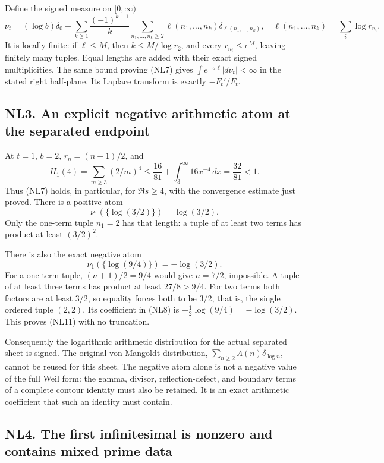 \documentclass[
  10pt,
  a4paper,
]{article}
\begin{document}
Define the signed measure on \([0,\infty)\) \[
\nu_t=(\log b)\delta_0+
\sum_{k\ge1}\frac{(-1)^{k+1}}k
\sum_{n_1,\ldots,n_k\ge2}
\ell(n_1,\ldots,n_k)\delta_{\ell(n_1,\ldots,n_k)},
\quad
\ell(n_1,\ldots,n_k)=\sum_i\log r_{n_i}.
\tag{NL8}
\] It is locally finite: if \(\ell\le M\), then \(k\le M/\log r_2\), and
every \(r_{n_i}\le e^M\), leaving finitely many tuples. Equal lengths
are added with their exact signed multiplicities. The same bound proving
(NL7) gives \(\int e^{-\sigma\ell}|d\nu_t|<\infty\) in the stated right
half-plane. Its Laplace transform is exactly \(-F_t'/F_t\).

\subsection{NL3. An explicit negative arithmetic atom at the separated
endpoint}\label{nl3.-an-explicit-negative-arithmetic-atom-at-the-separated-endpoint}

At \(t=1\), \(b=2\), \(r_n=(n+1)/2\), and \[
H_1(4)=\sum_{m\ge3}(2/m)^4
\le\frac{16}{81}+\int_3^\infty16x^{-4}\,dx
=\frac{32}{81}<1.
\tag{NL9}
\] Thus (NL7) holds, in particular, for \(\Re s\ge4\), with the
convergence estimate just proved. There is a positive atom \[
\nu_1(\{\log(3/2)\})=\log(3/2).
\tag{NL10}
\] Only the one-term tuple \(n_1=2\) has that length: a tuple of at
least two terms has product at least \((3/2)^2\).

There is also the exact negative atom \[
\boxed{\nu_1(\{\log(9/4)\})=-\log(3/2).}
\tag{NL11}
\] For a one-term tuple, \((n+1)/2=9/4\) would give \(n=7/2\),
impossible. A tuple of at least three terms has product at least
\(27/8>9/4\). For two terms both factors are at least \(3/2\), so
equality forces both to be \(3/2\), that is, the single ordered tuple
\((2,2)\). Its coefficient in (NL8) is
\(-\tfrac12\log(9/4)=-\log(3/2)\). This proves (NL11) with no
truncation.

Consequently the logarithmic arithmetic distribution for the actual
separated sheet is signed. The original von Mangoldt distribution,
\(\sum_{n\ge2}\Lambda(n)\delta_{\log n}\), cannot be reused for this
sheet. The negative atom alone is not a negative value of the full Weil
form: the gamma, divisor, reflection-defect, and boundary terms of a
complete contour identity must also be retained. It is an exact
arithmetic coefficient that such an identity must contain.

\subsection{NL4. The first infinitesimal is nonzero and contains mixed
prime
data}\label{nl4.-the-first-infinitesimal-is-nonzero-and-contains-mixed-prime-data}
\end{document}
